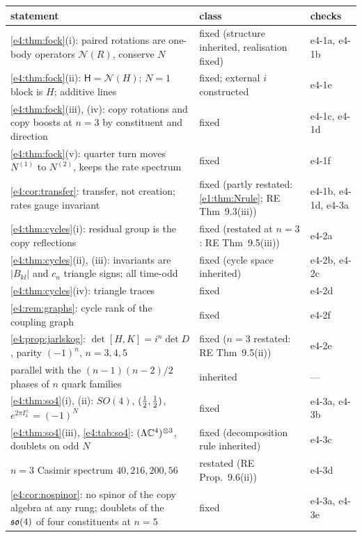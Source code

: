 \begin{table}[htbp]
\centering
\footnotesize
\begin{tabular}{@{}>{\raggedright\arraybackslash}p{8.0cm}>{\raggedright\arraybackslash}p{4.8cm}>{\raggedright\arraybackslash}p{2.0cm}@{}}
\toprule
statement & class & checks\\
\midrule
\cref{e4:thm:fock}(i): paired rotations are one-body operators $\mathcal N(R)$, conserve $N$ & fixed (structure inherited, realisation fixed) & e4-1a, e4-1b\\
\cref{e4:thm:fock}(ii): $\mathsf H=\mathcal N(H)$; $N=1$ block is $H$; additive lines & fixed; external $i$ constructed & e4-1e\\
\cref{e4:thm:fock}(iii), (iv): copy rotations and copy boosts at $n=3$ by constituent and direction & fixed & e4-1c, e4-1d\\
\cref{e4:thm:fock}(v): quarter turn moves $N^{(1)}$ to $N^{(2)}$, keeps the rate spectrum & fixed & e4-1f\\
\cref{e4:cor:transfer}: transfer, not creation; rates gauge invariant & fixed (partly restated: \cref{e1:thm:Nrule}; RE Thm~9.3(iii)) & e4-1b, e4-1d, e4-3a\\
\cref{e4:thm:cycles}(i): residual group is the copy reflections & fixed (restated at $n=3$: RE Thm~9.5(iii)) & e4-2a\\
\cref{e4:thm:cycles}(ii), (iii): invariants are $|B_{kl}|$ and $c_n$ triangle signs; all time-odd & fixed (cycle space inherited) & e4-2b, e4-2c\\
\cref{e4:thm:cycles}(iv): triangle traces & fixed & e4-2d\\
\cref{e4:rem:graphs}: cycle rank of the coupling graph & fixed & e4-2f\\
\cref{e4:prop:jarlskog}: $\det[H,K]=i^n\det D$, parity $(-1)^n$, $n=3,4,5$ & fixed ($n=3$ restated: RE Thm~9.5(ii)) & e4-2e\\
parallel with the $(n-1)(n-2)/2$ phases of $n$ quark families & inherited & ---\\
\cref{e4:thm:so4}(i), (ii): $SO(4)$, $(\tfrac12,\tfrac12)$, $e^{2\pi I^\pm_3}=(-1)^N$ & fixed & e4-3a, e4-3b\\
\cref{e4:thm:so4}(iii), \cref{e4:tab:so4}: $(\Lambda\mathbb{C}^4)^{\otimes3}$, doublets on odd $N$ & fixed (decomposition rule inherited) & e4-3c\\
$n=3$ Casimir spectrum $40,216,200,56$ & restated (RE Prop.~9.6(ii)) & e4-3d\\
\cref{e4:cor:nospinor}: no spinor of the copy algebra at any rung; doublets of the $\mathfrak{so}(4)$ of four constituents at $n=5$ & fixed & e4-3a, e4-3e\\

\end{tabular}
\end{table}
